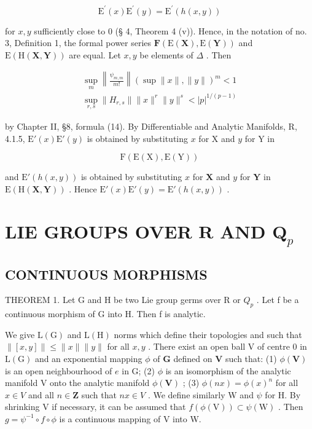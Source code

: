 \[
\mathrm{E} ^ {\prime} (x) \mathrm{E} ^ {\prime} (y) = \mathrm{E} ^ {\prime} (h (x, y))
\]

for \(x, y\) sufficiently close to 0 (§ 4, Theorem 4 (v)). Hence, in the notation of no. 3, Definition 1, the formal power series \(\mathbf{F}(\mathrm{E}(\mathbf{X}), \mathrm{E}(\mathbf{Y}))\) and \(\mathrm{E}(\mathrm{H}(\mathbf{X}, \mathbf{Y}))\) are equal. Let \(x, y\) be elements of \(\Delta\) . Then

\[
\begin{array}{l} \sup _ {m} \left\| \frac {\psi_ {m , m}}{m !} \right\| (\sup \| x \|, \| y \|) ^ {m} <   1 \\ \sup _ {r, s} \| H _ {r, s} \| \| x \| ^ {r} \| y \| ^ {s} <   | p | ^ {1 / (p - 1)} \end{array}
\]

by Chapter II, §8, formula (14). By Differentiable and Analytic Manifolds, R, 4.1.5, \(\mathrm{E}'(x)\mathrm{E}'(y)\) is obtained by substituting \(x\) for X and \(y\) for Y in

\[
\mathrm{F} (\mathrm{E} (\mathrm{X}), \mathrm{E} (\mathrm{Y}))
\]

and \(\mathrm{E}'(h(x,y))\) is obtained by substituting \(x\) for \(\mathbf{X}\) and \(y\) for \(\mathbf{Y}\) in \(\mathrm{E}(\mathrm{H}(\mathbf{X},\mathbf{Y}))\) . Hence \(\mathrm{E}'(x)\mathrm{E}'(y) = \mathrm{E}'(h(x,y))\) .

\section{\texorpdfstring{LIE GROUPS OVER \(\mathbf{R}\) AND \(\mathbf{Q}_p\)}{LIE GROUPS OVER R AND \textbackslash mathbf\{Q\}\_p}}

\subsection{CONTINUOUS MORPHISMS}

THEOREM 1. Let G and H be two Lie group germs over R or \(Q_{p}\) . Let f be a continuous morphism of G into H. Then f is analytic.

We give \(\mathrm{L}(\mathrm{G})\) and \(\mathrm{L}(\mathrm{H})\) norms which define their topologies and such that \(\| [x,y]\| \leqslant \| x\| \| y\|\) for all \(x,y\) . There exist an open ball V of centre 0 in \(\mathrm{L}(\mathrm{G})\) and an exponential mapping \(\phi\) of \(\mathbf{G}\) defined on \(\mathbf{V}\) such that: (1) \(\phi (\mathbf{V})\) is an open neighbourhood of \(e\) in G; (2) \(\phi\) is an isomorphism of the analytic manifold V onto the analytic manifold \(\phi (\mathbf{V})\) ; (3) \(\phi (nx) = \phi (x)^n\) for all \(x\in V\) and all \(n\in \mathbf{Z}\) such that \(nx\in V\) . We define similarly W and \(\psi\) for H. By shrinking V if necessary, it can be assumed that \(f(\phi (\mathrm{V}))\subset \psi (\mathrm{W})\) . Then \(g = \psi^{-1}\circ f\circ \phi\) is a continuous mapping of V into W.

